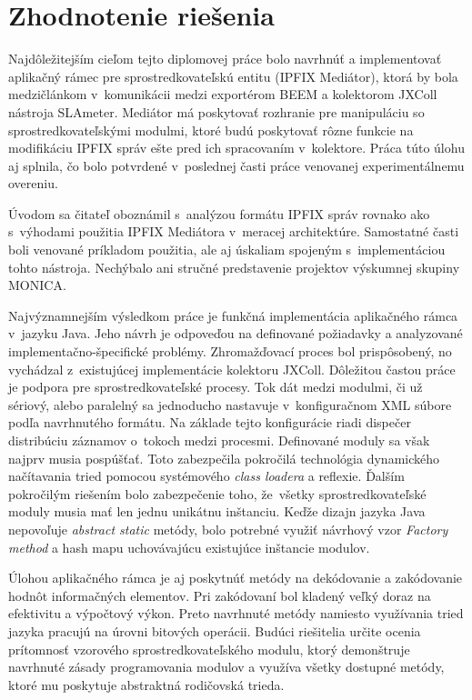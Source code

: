 \section{Zhodnotenie rie\v{s}enia}

Najdôležitejším cieľom tejto diplomovej práce bolo navrhnúť a implementovať aplikačný rámec pre 
sprostredkovateľskú entitu (IPFIX Mediátor), ktorá by bola medzičlánkom v~komunikácii medzi exportérom
BEEM a kolektorom JXColl nástroja SLAmeter. Mediátor má poskytovať rozhranie pre manipuláciu so 
sprostredkovateľskými modulmi, ktoré budú poskytovať rôzne funkcie na modifikáciu IPFIX správ ešte pred ich 
spracovaním v~kolektore. Práca túto úlohu aj splnila, čo bolo potvrdené v~poslednej časti 
práce venovanej experimentálnemu overeniu.

Úvodom sa čitateľ oboznámil s~analýzou formátu IPFIX správ rovnako ako s~výhodami použitia 
IPFIX Mediátora v~meracej architektúre. Samostatné časti boli venované príkladom použitia, ale aj 
úskaliam spojeným s~implementáciou tohto nástroja. Nechýbalo ani stručné predstavenie projektov výskumnej 
skupiny MONICA.

Najvýznamnejším výsledkom práce je funkčná implementácia aplikačného rámca v~jazyku Java. Jeho návrh je 
odpoveďou na definované požiadavky a analyzované implementačno-špecifické problémy. Zhromažďovací proces 
bol prispôsobený, no vychádzal z~existujúcej implementácie kolektoru JXColl. Dôležitou častou práce je 
podpora pre sprostredkovateľské procesy. Tok dát medzi modulmi, či už sériový, alebo paralelný sa  
jednoducho nastavuje v~konfiguračnom XML súbore podľa navrhnutého formátu. Na základe tejto konfigurácie 
riadi dispečer distribúciu záznamov o~tokoch medzi procesmi. Definované moduly sa však najprv musia 
pospúšťať. Toto zabezpečila pokročilá technológia dynamického načítavania tried pomocou 
systémového \emph{class loadera} a reflexie. Ďalším pokročilým riešením bolo zabezpečenie toho, 
že~všetky sprostredkovateľské moduly musia mať len jednu unikátnu inštanciu. Keďže dizajn jazyka Java 
nepovoľuje \emph{abstract static} metódy, bolo potrebné využiť návrhový vzor \emph{Factory method} a 
hash mapu uchovávajúcu existujúce inštancie modulov. 

Úlohou aplikačného rámca je aj poskytnúť metódy na dekódovanie a zakódovanie hodnôt informačných elementov.
Pri zakódovaní bol kladený veľký doraz na efektivitu a výpočtový výkon. Preto navrhnuté metódy namiesto 
využívania tried jazyka pracujú na úrovni bitových operácii. Budúci riešitelia určite ocenia prítomnosť
vzorového sprostredkovateľského modulu, ktorý demonštruje navrhnuté zásady programovania modulov a 
využíva všetky dostupné metódy, ktoré mu poskytuje abstraktná rodičovská trieda. 

